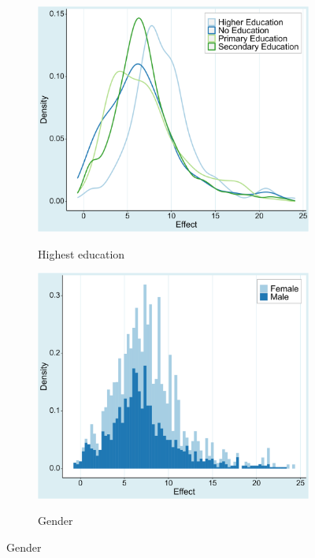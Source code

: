 \begin{figure}[!htbp]
\begin{center}
      \begin{subfigure}[!htbp]{0.38\textwidth}
         \vspace{0.2cm}
         \caption{Highest education}
         \vspace{-0.1cm}
         \includegraphics[width=0.95\linewidth]{Figures/Prima Facie/prima_facie_education.png}
         \label{fig:prima_facie_education}
      \end{subfigure}
      \begin{subfigure}[!htbp]{0.38\textwidth}
         \vspace{0.2cm}
         \caption{Gender}
         \vspace{-0.1cm}
         \includegraphics[width=0.95\linewidth]{Figures/Prima Facie/prima_facie_gender.png}
         \label{fig:prima_facie_gender}
      \end{subfigure}


\end{center}
\end{figure}
